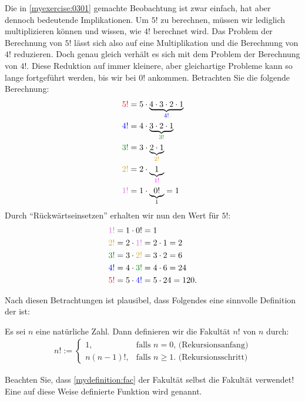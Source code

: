 \noindent
Die in \cref{myexercise:0301} gemachte Beobachtung ist zwar einfach, hat aber dennoch bedeutende Implikationen. Um $5!$ zu berechnen, müssen wir lediglich multiplizieren können und wissen, wie $4!$ berechnet wird. Das Problem der Berechnung von $5!$ lässt sich also auf eine Multiplikation und die Berechnung von $4!$ reduzieren. Doch genau gleich verhält es sich mit dem Problem der Berechnung von $4!$. Diese Reduktion auf immer kleinere, aber gleichartige Probleme kann so lange fortgeführt werden, bis wir bei $0!$ ankommen. Betrachten Sie die folgende Berechnung:
\begin{align*}
    \textcolor{Red}{5!} &= 5\cdot\underbrace{4\cdot 3\cdot 2\cdot 1}_{\textcolor{Blue}{4!}} \\
    \textcolor{Blue}{4!} &= 4\cdot\underbrace{3\cdot 2\cdot 1}_{\textcolor{Green}{3!}} \\
    \textcolor{Green}{3!} &= 3\cdot\underbrace{2\cdot 1}_{\textcolor{Goldenrod}{2!}} \\
    \textcolor{Goldenrod}{2!} &= 2\cdot\underbrace{1}_{\textcolor{Fuchsia}{1!}} \\
    \textcolor{Orchid}{1!} &= 1\cdot\underbrace{0!}_{1} = 1
\end{align*}
Durch \enquote{Rückwärtseinsetzen} erhalten wir nun den Wert für $5!$:
\begin{align*}
    \textcolor{Orchid}{1!} &= 1\cdot 0! = 1 \\
    \textcolor{Goldenrod}{2!} &= 2\cdot\textcolor{Orchid}{1!} = 2\cdot 1 = 2 \\
    \textcolor{Green}{3!} &= 3\cdot \textcolor{Goldenrod}{2!} = 3\cdot 2 = 6 \\
    \textcolor{Blue}{4!} &= 4\cdot\textcolor{Green}{3!} = 4\cdot 6 = 24 \\
    \textcolor{Red}{5!} &= 5\cdot\textcolor{Blue}{4!} = 5\cdot 24 = 120.
\end{align*}

\noindent
Nach diesen Betrachtungen ist plausibel, dass Folgendes eine sinnvolle Definition der  ist:
\begin{mydefinition}[Fakultät]\label{mydefinition:fac}
Es sei $n$ eine natürliche Zahl. Dann definieren wir die Fakultät $n!$ von $n$ durch:
\begin{align}\label{eq:fakultaet}
n! := 
  \begin{cases}
    1, &\text{falls $n=0$, (Rekursionsanfang)} \\
    n(n-1)!, & \text{falls  $n\geq 1$. (Rekursionsschritt)}
  \end{cases}
\end{align}
\end{mydefinition}
\noindent
Beachten Sie, dass \cref{mydefinition:fac} der Fakultät selbst die Fakultät verwendet! Eine auf diese Weise definierte Funktion wird  genannt.

